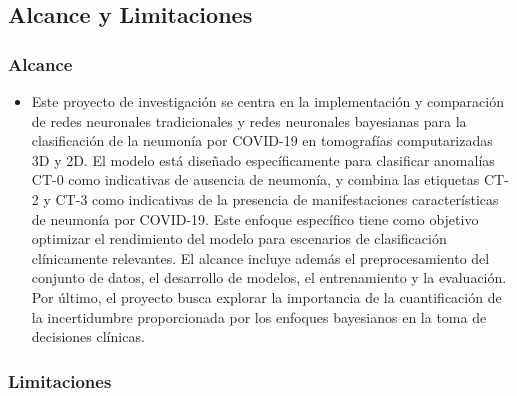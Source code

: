 \documentclass[10pt, oneside, a4paper]{article}
\begin{document}
	\subsection{Alcance y Limitaciones} \label{alcance_limitaciones}

	\subsubsection{Alcance}
	
	\begin{itemize}
		\item Este proyecto de investigación se centra en la implementación y comparación de redes neuronales tradicionales y redes neuronales bayesianas para la clasificación de la neumonía por COVID-19 en tomografías computarizadas 3D y 2D. El modelo está diseñado específicamente para clasificar anomalías CT-0 como indicativas de ausencia de neumonía, y combina las etiquetas CT-2 y CT-3 como indicativas de la presencia de manifestaciones características de neumonía por COVID-19. Este enfoque específico tiene como objetivo optimizar el rendimiento del modelo para escenarios de clasificación clínicamente relevantes. El alcance incluye además el preprocesamiento del conjunto de datos, el desarrollo de modelos, el entrenamiento y la evaluación. Por último, el proyecto busca explorar la importancia de la cuantificación de la incertidumbre proporcionada por los enfoques bayesianos en la toma de decisiones clínicas.
	\end{itemize}

	\subsubsection{Limitaciones}
\end{document}
